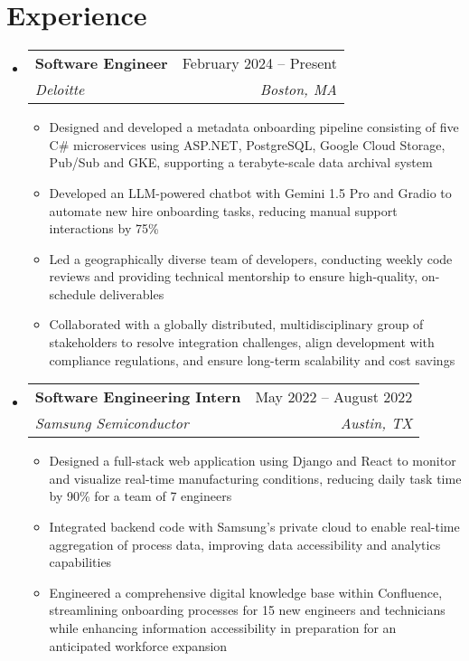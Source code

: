 \documentclass[letterpaper,11pt]{article}
\makeatletter
\newcommand{\resumeItem}[1]{
  \item\small{
    {#1 \vspace{-2pt}}
  }
}
\newcommand{\resumeSubheading}[4]{
  \vspace{-2pt}\item
    \begin{tabular*}{0.97\textwidth}[t]{l@{\extracolsep{\fill}}r}
      \textbf{#1} & #2 \\
      \textit{\small#3} & \textit{\small #4} \\
    \end{tabular*}\vspace{-7pt}
}
\newcommand{\resumeSubHeadingListStart}{\begin{itemize}[leftmargin=0.15in, label={}]}
\newcommand{\resumeSubHeadingListEnd}{\end{itemize}}
\newcommand{\resumeItemListStart}{\begin{itemize}}
\newcommand{\resumeItemListEnd}{\end{itemize}\vspace{-5pt}}
\makeatother
\begin{document}
\section{Experience}
  \resumeSubHeadingListStart    
    \resumeSubheading
      {Software Engineer}{February 2024 -- Present}
      {Deloitte}{Boston, MA}
      \resumeItemListStart
        \resumeItem{Designed and developed a metadata onboarding pipeline consisting of five C\# microservices using  ASP.NET, PostgreSQL, Google Cloud Storage, Pub/Sub and GKE, supporting a terabyte-scale data archival system}
        \resumeItem{Developed an LLM-powered chatbot with Gemini 1.5 Pro and Gradio to automate new hire onboarding tasks, reducing manual support interactions by 75\%}
        \resumeItem{Led a geographically diverse team of developers, conducting weekly code reviews and providing technical mentorship to ensure high-quality, on-schedule deliverables}
        \resumeItem{Collaborated with a globally distributed, multidisciplinary group of stakeholders to resolve integration challenges, align development with compliance regulations, and ensure long-term scalability and cost savings}
      \resumeItemListEnd
    \resumeSubheading
      {Software Engineering Intern}{May 2022 -- August 2022}
      {Samsung Semiconductor}{Austin, TX}
      \resumeItemListStart
        \resumeItem{Designed a full-stack web application using Django and React to monitor and visualize real-time manufacturing conditions, reducing daily task time by 90\% for a team of 7 engineers}
        \resumeItem{Integrated backend code with Samsung's private cloud to enable real-time aggregation of process data, improving data accessibility and analytics capabilities}
        \resumeItem{Engineered a comprehensive digital knowledge base within Confluence, streamlining onboarding processes for 15 new engineers and technicians while enhancing information accessibility in preparation for an anticipated workforce expansion}
      \resumeItemListEnd
  \resumeSubHeadingListEnd

\end{document}
